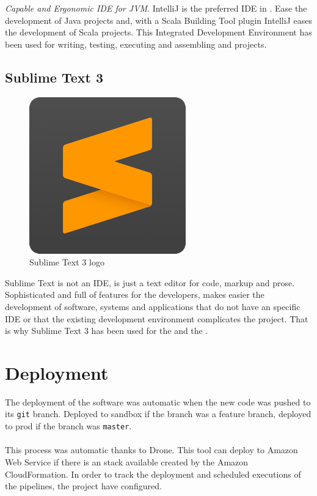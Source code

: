 \textit{Capable and Ergonomic IDE for JVM}. IntelliJ is the preferred IDE\cite{ide} in \company. Ease the development of Java projects and, with a Scala Building Tool plugin IntelliJ eases the development of Scala projects. This Integrated Development Environment has been used for writing, testing, executing and assembling  and  projects.

\subsection*{Sublime Text 3\cite{sublimetext}}

\begin{figure}[H]
\centering
\includegraphics[scale=0.1]{resources/sublime-logo.png}
\caption{Sublime Text 3 logo}
\end{figure}

Sublime Text is not an IDE, is just a text editor for code, markup and prose. Sophisticated and full of features for the developers, makes easier the development of software, systems and applications that do not have an specific IDE or that the existing development environment complicates the project. That is why Sublime Text 3 has been used for the  and the .

\section{Deployment}

The deployment of the software was automatic when the new code was pushed to its \texttt{git} branch. Deployed to sandbox if the branch was a feature branch, deployed to prod if the branch was \texttt{master}.
\\\\
This process was automatic thanks to Drone. This tool can deploy to Amazon Web Service if there is an stack available created by the Amazon CloudFormation. In order to track the deployment and scheduled executions of the pipelines, the project have  configured.

